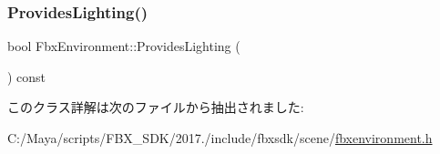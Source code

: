 \subsubsection{\texorpdfstring{Provides\+Lighting()}{ProvidesLighting()}}
{\footnotesize\ttfamily bool Fbx\+Environment\+::\+Provides\+Lighting (\begin{DoxyParamCaption}{ }\end{DoxyParamCaption}) const}



このクラス詳解は次のファイルから抽出されました\+:\begin{DoxyCompactItemize}
\item 
C\+:/\+Maya/scripts/\+F\+B\+X\+\_\+\+S\+D\+K/2017./include/fbxsdk/scene/\hyperlink{fbxenvironment_8h}{fbxenvironment.\+h}\end{DoxyCompactItemize}
